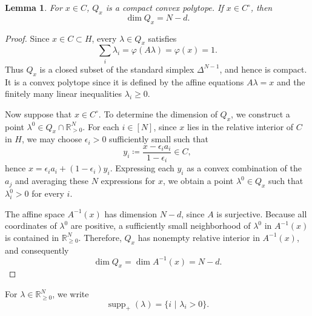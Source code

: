 \documentclass[12pt]{amsart}
\newtheorem{lemma}[theorem]{Lemma}
\numberwithin{equation}{section}
\numberwithin{theorem}{section}
\newcommand{\op}{\operatorname}
\newcommand{\R}{\mathbb{R}}
\begin{document}
\begin{lemma}
  \label{lemma-polytope}
  For $x\in C$, $Q_x$ is a compact convex polytope. If $x\in C^\circ$, then
  \begin{equation*}
    \op{dim}Q_x=N-d.
  \end{equation*}
\end{lemma}
\begin{proof}
  Since $x\in C\subset H$, every $\lambda\in Q_x$ satisfies
  \begin{equation*}
    \sum_i\lambda_i=\varphi(A\lambda)=\varphi(x)=1.
  \end{equation*}
  Thus $Q_x$ is a closed subset of the standard simplex $\Delta^{N-1}$, and hence is compact. It is a convex polytope since it is defined by the affine equations $A\lambda=x$ and the finitely many linear inequalities $\lambda_i\geq0$.

  Now suppose that $x\in C^\circ$. To determine the dimension of $Q_x$, we construct a point $\lambda^0\in Q_x\cap \R^N_{>0}$. For each $i\in[N]$, since $x$ lies in the relative interior of $C$ in $H$, we may choose $\epsilon_i>0$ sufficiently small such that
  \begin{equation*}
    y_i\coloneqq\frac{x-\epsilon_i a_i}{1-\epsilon_i}\in C,
  \end{equation*}
  hence $x=\epsilon_i a_i+(1-\epsilon_i) y_i$. Expressing each $y_i$ as a convex combination of the $a_j$ and averaging these $N$ expressions for $x$, we obtain a point $\lambda^0\in Q_x$ such that $\lambda^0_i>0$ for every $i$.

  The affine space $A^{-1}(x)$ has dimension $N-d$, since $A$ is surjective. Because all coordinates of $\lambda^0$ are positive, a sufficiently small neighborhood of $\lambda^0$ in $A^{-1}(x)$ is contained in $\R^N_{\geq0}$. Therefore, $Q_x$ has nonempty relative interior in $A^{-1}(x)$, and consequently
  \begin{equation*}
    \op{dim}Q_x= \op{dim}A^{-1}(x)=N-d.
  \end{equation*}
\end{proof}

For $\lambda\in \R^N_{\geq0}$, we write
\begin{equation*}
  \op{supp}_+(\lambda)=\{i\,\,|\,\,\lambda_i>0\}.
\end{equation*}
\end{document}
